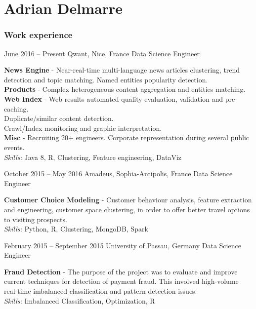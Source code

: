 \documentclass{tccv}
\renewcommand{\it}{\textit}
\renewcommand{\bf}{\textbf}
\begin{document}
\part{Adrian Delmarre}

\section{Work experience}

\begin{eventlist}

\item{June 2016 -- Present}
    {Qwant, Nice, France}
    {Data Science Engineer}

\bf{News Engine} - Near-real-time multi-language news articles clustering, trend detection and topic matching. Named entities popularity detection.\\
\bf{Products} - Complex heterogeneous content aggregation and entities matching.\\
\bf{Web Index} - Web results automated quality evaluation, validation and pre-caching.\\
Duplicate/similar content detection.\\
Crawl/Index monitoring and graphic interpretation.\\
\bf{Misc} - Recruiting 20+ engineers. Corporate representation during several public events.\\
\it{Skills:} Java 8, R, Clustering, Feature engineering, DataViz

\item{October 2015 -- May 2016}
    {Amadeus, Sophia-Antipolis, France}
    {Data Science Engineer}

\bf{Customer Choice Modeling} - Customer behaviour analysis, feature extraction and engineering, customer space clustering, in order to offer better travel options to visiting prospects.\\
\it{Skills:} Python, R, Clustering, MongoDB, Spark

\item{February 2015 -- September 2015}
    {University of Passau, Germany}
    {Data Science Engineer}

\bf{Fraud Detection} - The purpose of the project was to evaluate and improve current techniques for detection of payment fraud. This involved high-volume real-time imbalanced classification and pattern detection issues.\\
\it{Skills:} Imbalanced Classification, Optimization, R


\end{eventlist}
\end{document}
